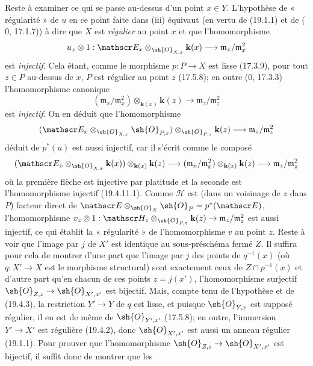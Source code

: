 Reste à examiner ce qui se passe au-dessus d'un point $x\in Y$. L'hypothèse de « régularité » de $u$ en ce point faite dans (iii) équivaut (en vertu de (19.1.1) et de ($0$, 17.1.7)) à dire que $X$ est \emph{régulier} au point $x$ et que l'homomorphisme
\[
  u_x\otimes1:\mathscr E_x\otimes_{\sh{O}_{X,x}}\mathbf k(x)\longrightarrow\mathfrak m_x/\mathfrak m_x^2
\]
est \emph{injectif}. Cela étant, comme le morphisme $p:P\to X$ est lisse (17.3.9), pour tout $z\in P$ au-dessus de $x$, $P$ est régulier au point $z$ (17.5.8); en outre ($0$, 17.3.3) l'homomorphisme canonique
\begin{equation}
  (\mathfrak m_x/\mathfrak m_x^2)\otimes_{\mathbf k(x)}\mathbf k(z)\longrightarrow\mathfrak m_z/\mathfrak m_z^2
  \tag{19.4.11.1}\label{IV.19.4.11.1}
\end{equation}
est \emph{injectif}. On en déduit que l'homomorphisme
\[
  (\mathscr E_x\otimes_{\sh{O}_{X,x}}\sh{O}_{P,z})\otimes_{\sh{O}_{P,z}}\mathbf k(z)\longrightarrow\mathfrak m_z/\mathfrak m_z^2
\]
déduit de $p^*(u)$ est aussi injectif, car il s'écrit comme le composé
\[
  (\mathscr E_x\otimes_{\sh{O}_{X,x}}\mathbf k(x))\otimes_{\mathbf k(x)}\mathbf k(z)\longrightarrow(\mathfrak m_x/\mathfrak m_x^2)\otimes_{\mathbf k(x)}\mathbf k(z)\longrightarrow\mathfrak m_z/\mathfrak m_z^2
\]
où la première flèche est injective par platitude et la seconde est l'homomorphisme injectif (19.4.11.1). Comme $\mathscr H$ est (dans un voisinage de $z$ dans $P$) facteur direct de $\mathscr E\otimes_{\sh{O}_X}\sh{O}_P=p^*(\mathscr E)$, l'homomorphisme $v_z\otimes1:\mathscr H_z\otimes_{\sh{O}_{P,z}}\mathbf k(z)\to\mathfrak m_z/\mathfrak m_z^2$ est aussi injectif, ce qui établit la « régularité » de l'homomorphisme $v$ au point $z$. Reste à voir que l'image par $j$ de $X'$ est identique au sous-préschéma fermé $Z$. Il suffira pour cela de montrer d'une part que l'image par $j$ des points de $q^{-1}(x)$ (où $q:X'\to X$ est le morphisme structural) sont exactement ceux de $Z\cap p^{-1}(x)$ et d'autre part qu'en chacun de ces points $z=j(x')$, l'homomorphisme surjectif $\sh{O}_{Z,z}\to\sh{O}_{X',x'}$ est bijectif. Mais, compte tenu de l'hypothèse et de (19.4.3), la restriction $Y'\to Y$ de $q$ est lisse, et puisque $\sh{O}_{Y,x}$ est supposé régulier, il en est de même de $\sh{O}_{Y',x'}$ (17.5.8); en outre, l'immersion $Y'\to X'$ est régulière (19.4.2), donc $\sh{O}_{X',x'}$ est aussi un anneau régulier (19.1.1). Pour prouver que l'homomorphisme $\sh{O}_{Z,z}\to\sh{O}_{X',x'}$ est bijectif, il suffit donc de montrer que les


